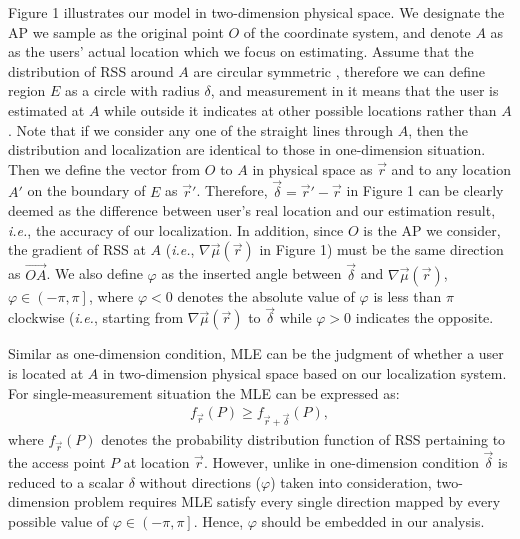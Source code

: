 \documentclass[10pt,conference,compsocconf,letterpaper]{IEEEtran}
\newcommand{\ie}{{\em i.e.}}
\begin{document}
Figure 1 illustrates our model in two-dimension physical space. We designate the AP we sample as the original point $O$ of the coordinate system, and denote $A$ as as the users' actual location which we focus on estimating. Assume that the distribution of RSS around $A$ are circular symmetric , therefore we can define region $E$ as a circle with radius $\delta$, and measurement in it means that the user is estimated at $A$ while outside it indicates at other possible locations rather than $A$. Note that if we consider any one of the straight lines through $A$, then the distribution and localization are identical to those in one-dimension situation. Then we define the vector from $O$ to $A$ in physical space as $\vec r$ and to any location $A'$ on the boundary of $E$ as $\vec r'$. Therefore, $\vec \delta  = \vec r' - \vec r$ in Figure 1 can be clearly deemed as the difference between user's real location and our estimation result, \ie, the accuracy of our localization. In addition, since $O$ is the AP we consider, the gradient of RSS at $A$ (\ie, $\nabla \vec \mu (\vec r)$ in Figure 1) must be the same direction as $\overrightarrow{OA}$. We also define $\varphi$ as the inserted angle between $\vec \delta $ and $\nabla \vec \mu (\vec r)$, $\varphi  \in \left( { - \pi ,\pi } \right]$, where $\varphi < 0$ denotes the absolute value of $\varphi$ is less than $\pi$ clockwise (\ie, starting from $\nabla \vec \mu (\vec r)$ to $\vec \delta $ while $\varphi  > 0$ indicates the opposite.

Similar as one-dimension condition, MLE can be the judgment of whether a user is located at $A$ in two-dimension physical space based on our localization system. For single-measurement situation the MLE can be expressed as:
\begin{align}
{f_{\vec r}}(P) \ge {f_{\vec r + \vec \delta }}(P),
\end{align}
where ${f_{\vec r}}(P)$ denotes the probability distribution function of RSS pertaining to the access point $P$ at location $\vec r$. However, unlike in one-dimension condition $\vec \delta$ is reduced to a scalar $\delta$ without directions ($\varphi$) taken into consideration, two-dimension problem requires MLE satisfy every single direction mapped by every possible value of $\varphi  \in \left( { - \pi ,\pi } \right]$. Hence, $\varphi$ should be embedded in our analysis.
\end{document}
